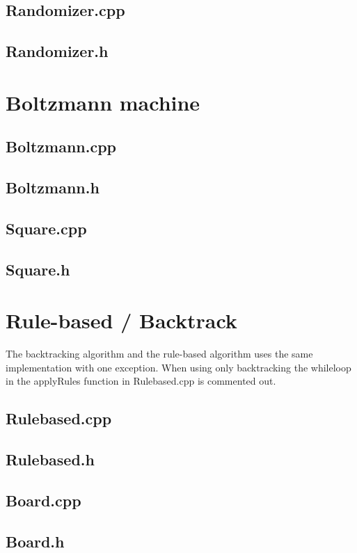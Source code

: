 \documentclass[a4paper,11pt]{kth-mag}
\begin{document}
\subsection{Randomizer.cpp}

\subsection{Randomizer.h}


\section{Boltzmann machine}
\subsection{Boltzmann.cpp}

\subsection{Boltzmann.h}


\subsection{Square.cpp}

\subsection{Square.h}


\section{Rule-based / Backtrack}
The backtracking algorithm and the rule-based algorithm uses the same implementation with one exception. When using only backtracking the whileloop in the applyRules function in Rulebased.cpp is commented out.
\subsection{Rulebased.cpp}

\subsection{Rulebased.h}

\subsection{Board.cpp}

\subsection{Board.h}

\end{document}
